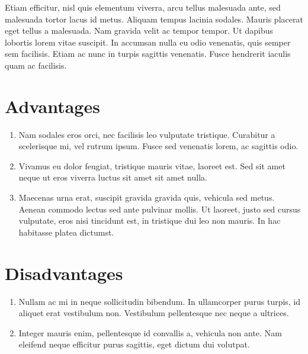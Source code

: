 \documentclass{jimouris-review}
\begin{document}
Etiam efficitur, nisl quis elementum viverra, arcu tellus malesuada ante, sed malesuada tortor lacus id metus. Aliquam tempus lacinia sodales. Mauris placerat eget tellus a malesuada. Nam gravida velit ac tempor tempor. Ut dapibus lobortis lorem vitae suscipit. In accumsan nulla eu odio venenatis, quis semper sem facilisis. Etiam ac nunc in turpis sagittis venenatis. Fusce hendrerit iaculis quam ac facilisis.

\section{Advantages}
\begin{enumerate}[\textbf{+}]
    \item Nam sodales eros orci, nec facilisis leo vulputate tristique. Curabitur a scelerisque mi, vel rutrum ipsum. Fusce sed venenatis lorem, ac sagittis odio.
    \item Vivamus eu dolor feugiat, tristique mauris vitae, laoreet est. Sed sit amet neque ut eros viverra luctus sit amet sit amet nulla. 
    \item Maecenas urna erat, suscipit gravida gravida quis, vehicula sed metus. Aenean commodo lectus sed ante pulvinar mollis. Ut laoreet, justo sed cursus vulputate, eros nisi tincidunt est, in tristique dui leo non mauris. In hac habitasse platea dictumst.
\end{enumerate}

\section{Disadvantages}
\begin{enumerate}[\textbf{--}]
    \item Nullam ac mi in neque sollicitudin bibendum. In ullamcorper purus turpis, id aliquet erat vestibulum non. Vestibulum pellentesque nec neque a ultrices. 
    \item Integer mauris enim, pellentesque id convallis a, vehicula non ante. Nam eleifend neque efficitur purus sagittis, eget dictum dui volutpat.
\end{enumerate}
\end{document}
